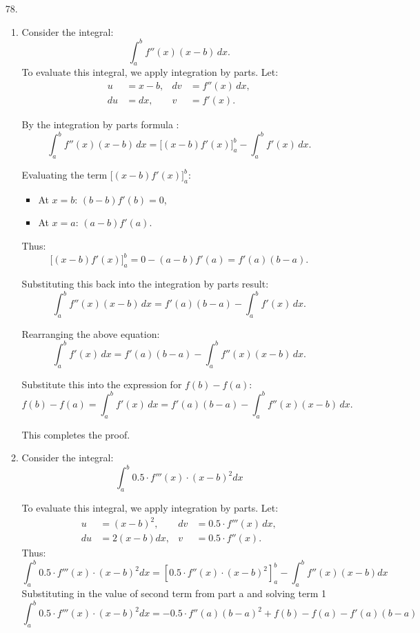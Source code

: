 \documentclass[12pt]{article}
\begin{document}
\begin{enumerate}


    \item [78. ]
    \begin{enumerate}
        \item 
Consider the integral:
\[
\int_a^b f''(x)(x-b) \, dx.
\]
To evaluate this integral, we apply integration by parts. Let:
\begin{align*}
u &= x-b, & dv &= f''(x) \, dx, \\
du &= dx, & v &= f'(x).
\end{align*}

By the integration by parts formula :
\[
\int_a^b f''(x)(x-b) \, dx = \Big[ (x-b)f'(x) \Big]_a^b - \int_a^b f'(x) \, dx.
\]

Evaluating the term \(\Big[ (x-b)f'(x) \Big]_a^b\):
\begin{itemize}
    \item At \(x = b\): \((b-b)f'(b) = 0\),
    \item At \(x = a\): \((a-b)f'(a)\).
\end{itemize}
Thus:
\[
\Big[ (x-b)f'(x) \Big]_a^b = 0 - (a-b)f'(a) = f'(a)(b-a).
\]

Substituting this back into the integration by parts result:
\[
\int_a^b f''(x)(x-b) \, dx = f'(a)(b-a) - \int_a^b f'(x) \, dx.
\]

Rearranging the above equation:
\[
\int_a^b f'(x) \, dx = f'(a)(b-a) - \int_a^b f''(x)(x-b) \, dx.
\]

Substitute this into the expression for \(f(b) - f(a)\):
\[
f(b) - f(a) = \int_a^b f'(x) \, dx = f'(a)(b-a) - \int_a^b f''(x)(x-b) \, dx.
\]

This completes the proof.

\item 
Consider the integral:
\[
\int_a^b 0.5 \cdot f'''(x)\cdot(x-b)^2 dx
\]

To evaluate this integral, we apply integration by parts. Let:
\begin{align*}
u &= (x-b)^2, & dv &= 0.5\cdot f'''(x) \, dx, \\
du &= 2(x-b)dx, & v &=0.5 \cdot f''(x).
\end{align*}
Thus:
\[
\int_a^b 0.5 \cdot f'''(x)\cdot(x-b)^2 dx = \left[0.5\cdot f''(x)\cdot (x-b)^2\right]_a^b - \int_a^b f''(x)(x-b)dx
\]
Substituting in the value of second term from part a and solving term 1
\[
\int_a^b 0.5 \cdot f'''(x)\cdot(x-b)^2 dx = -0.5\cdot f''(a)(b-a)^2 + f(b) - f(a) - f'(a)(b-a)
\]


\end{enumerate}
\end{enumerate}
\end{document}
